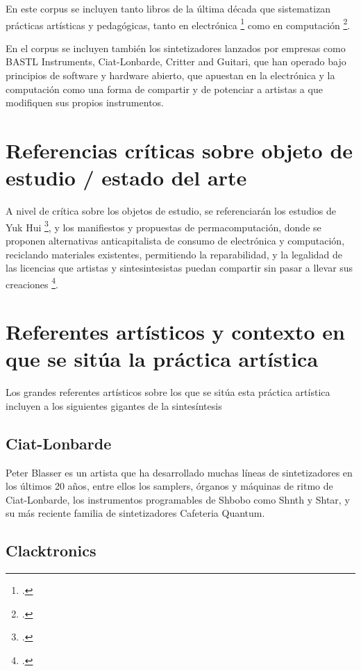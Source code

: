 \documentclass[../proyecto.tex]{subfiles}
\begin{document}
En este corpus se incluyen tanto libros de la última década que sistematizan prácticas artísticas y pedagógicas, tanto en electrónica \footcite{pearson_electronic_2024} como en computación \footcite{erwig_erase_2025}.

En el corpus se incluyen también los sintetizadores lanzados por empresas como BASTL Instruments, Ciat-Lonbarde, Critter and Guitari, que han operado bajo principios de software y hardware abierto, que apuestan en la electrónica y la computación como una forma de compartir y de potenciar a artistas a que modifiquen sus propios instrumentos.

\section{Referencias críticas sobre objeto de estudio / estado del arte}

A nivel de crítica sobre los objetos de estudio, se referenciarán los estudios de Yuk Hui \footcite{hui_arte_2025}, y los manifiestos y propuestas de permacomputación, donde se proponen alternativas anticapitalista de consumo de electrónica y computación, reciclando materiales existentes, permitiendo la reparabilidad, y la legalidad de las licencias que artistas y sintesintesistas puedan compartir sin pasar a llevar sus creaciones \footcite{tozzi_history_2017}.

\section{Referentes artísticos y contexto en que se sitúa la práctica artística}

Los grandes referentes artísticos sobre los que se sitúa esta práctica artística incluyen a los siguientes gigantes de la sintesíntesis 

\subsection{Ciat-Lonbarde}

Peter Blasser es un artista que ha desarrollado muchas líneas de sintetizadores en los últimos 20 años, entre ellos los samplers, órganos y máquinas de ritmo de Ciat-Lonbarde, los instrumentos programables de Shbobo como Shnth y Shtar, y su más reciente familia de sintetizadores Cafeteria Quantum.

\subsection{Clacktronics}
\end{document}
